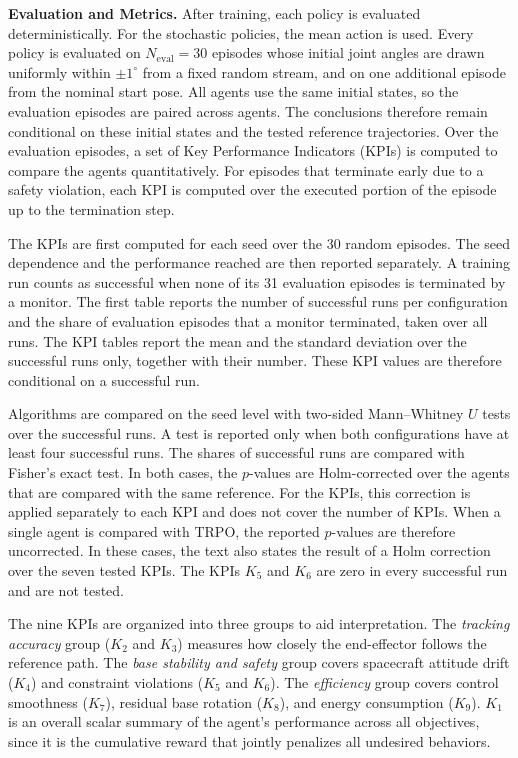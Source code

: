 \documentclass{ieeeaccess}
\begin{document}
\textbf{Evaluation and Metrics.} After training, each policy is evaluated deterministically. For the
stochastic policies, the mean action is used. Every policy is evaluated on $N_{\mathrm{eval}} = 30$
episodes whose initial joint angles are drawn uniformly within $\pm 1^\circ$ from a fixed random stream,
and on one additional episode from the nominal start pose. All agents use the same initial states, so
the evaluation episodes are paired across agents. The conclusions therefore remain conditional on these
initial states and the tested reference trajectories. Over the evaluation episodes, a set of Key
Performance Indicators (KPIs) is computed to compare the agents quantitatively. For episodes that
terminate early due to a safety violation, each KPI is computed over the executed portion of the episode
up to the termination step.

The KPIs are first computed for each seed over the 30 random episodes. The seed dependence and the
performance reached are then reported separately. A training run counts as successful when none of its
31 evaluation episodes is terminated by a monitor. The first table reports the number of successful runs
per configuration and the share of evaluation episodes that a monitor terminated, taken over all runs.
The KPI tables report the mean and the standard deviation over the successful runs only, together with
their number. These KPI values are therefore conditional on a successful run.

Algorithms are compared on the seed level with two-sided Mann--Whitney $U$ tests over the successful
runs. A test is reported only when both configurations have at least four successful runs. The shares of
successful runs are compared with Fisher's exact test. In both cases, the $p$-values are Holm-corrected
over the agents that are compared with the same reference. For the KPIs, this correction is applied
separately to each KPI and does not cover the number of KPIs. When a single agent is compared with TRPO,
the reported $p$-values are therefore uncorrected. In these cases, the text also states the result of a
Holm correction over the seven tested KPIs. The KPIs $K_5$ and $K_6$ are zero in every successful run and
are not tested.

The nine KPIs are organized into three groups to aid interpretation. The \emph{tracking accuracy}
group ($K_2$ and $K_3$) measures how closely the end-effector follows the reference path. The
\emph{base stability and safety} group covers spacecraft attitude drift ($K_4$) and constraint violations ($K_5$
and $K_6$). The \emph{efficiency} group covers control smoothness ($K_7$), residual base rotation ($K_8$), and
energy consumption ($K_9$). $K_1$ is an overall scalar summary of the agent's performance
across all objectives, since it is the cumulative reward that jointly penalizes all undesired
behaviors.
\end{document}
